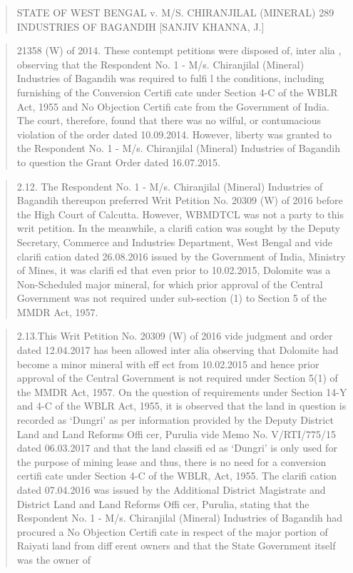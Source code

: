 \documentclass[12pt,a4paper]{article}
\newenvironment{judgequote}
  {\begin{quote}\small}
  {\end{quote}}
\begin{document}

\begin{judgequote}
STATE OF WEST BENGAL v. M/S. CHIRANJILAL (MINERAL) 289
INDUSTRIES OF BAGANDIH [SANJIV KHANNA, J.]
\end{judgequote}

\begin{judgequote}
21358 (W) of 2014. These contempt petitions were disposed of, inter alia ,
observing that the Respondent No. 1 - M/s. Chiranjilal (Mineral) Industries
of Bagandih was required to fulfi l the conditions, including furnishing of the
Conversion Certifi cate under Section 4-C of the WBLR Act, 1955 and No
Objection Certifi cate from the Government of India. The court, therefore,
found that there was no wilful, or contumacious violation of the order dated
10.09.2014. However, liberty was granted to the Respondent No. 1 - M/s.
Chiranjilal (Mineral) Industries of Bagandih to question the Grant Order
dated 16.07.2015.
\end{judgequote}

\begin{judgequote}
2.12. The Respondent No. 1 - M/s. Chiranjilal (Mineral) Industries of
Bagandih thereupon preferred Writ Petition No. 20309 (W) of 2016 before
the High Court of Calcutta. However, WBMDTCL was not a party to this
writ petition. In the meanwhile, a clarifi cation was sought by the Deputy
Secretary, Commerce and Industries Department, West Bengal and vide
clarifi cation dated 26.08.2016 issued by the Government of India, Ministry
of Mines, it was clarifi ed that even prior to 10.02.2015, Dolomite was a
Non-Scheduled major mineral, for which prior approval of the Central
Government was not required under sub-section (1) to Section 5 of the
MMDR Act, 1957.
\end{judgequote}

\begin{judgequote}
2.13.This Writ Petition No. 20309 (W) of 2016 vide judgment and
order dated 12.04.2017 has been allowed inter alia observing that Dolomite
had become a minor mineral with eff ect from 10.02.2015 and hence prior
approval of the Central Government is not required under Section 5(1) of
the MMDR Act, 1957. On the question of requirements under Section 14-Y
and 4-C of the WBLR Act, 1955, it is observed that the land in question is
recorded as `Dungri' as per information provided by the Deputy District
Land and Land Reforms Offi cer, Purulia vide Memo No. V/RTI/775/15
dated 06.03.2017 and that the land classifi ed as `Dungri' is only used for
the purpose of mining lease and thus, there is no need for a conversion
certifi cate under Section 4-C of the WBLR, Act, 1955. The clarifi cation dated
07.04.2016 was issued by the Additional District Magistrate and District
Land and Land Reforms Offi cer, Purulia, stating that the Respondent No.
1 - M/s. Chiranjilal (Mineral) Industries of Bagandih had procured a No
Objection Certifi cate in respect of the major portion of Raiyati land from
diff erent owners and that the State Government itself was the owner of
\end{judgequote}
\end{document}
